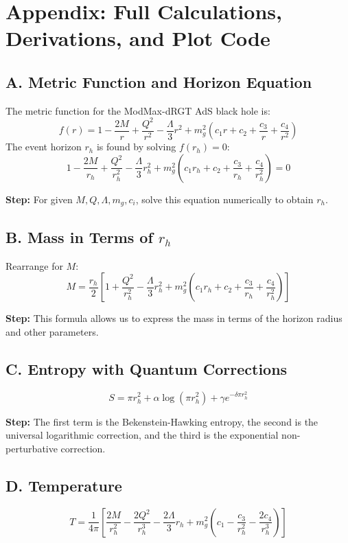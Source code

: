 \documentclass[12pt]{article}
\begin{document}
\section*{Appendix: Full Calculations, Derivations, and Plot Code}


\subsection*{A. Metric Function and Horizon Equation}
The metric function for the ModMax-dRGT AdS black hole is:
\begin{equation}
f(r) = 1 - \frac{2M}{r} + \frac{Q^2}{r^2} - \frac{\Lambda}{3} r^2 + m_g^2 (c_1 r + c_2 + \frac{c_3}{r} + \frac{c_4}{r^2})
\end{equation}
The event horizon $r_h$ is found by solving $f(r_h) = 0$:
\begin{equation}
1 - \frac{2M}{r_h} + \frac{Q^2}{r_h^2} - \frac{\Lambda}{3} r_h^2 + m_g^2 (c_1 r_h + c_2 + \frac{c_3}{r_h} + \frac{c_4}{r_h^2}) = 0
\end{equation}

\textbf{Step:} For given $M, Q, \Lambda, m_g, c_i$, solve this equation numerically to obtain $r_h$.

\subsection*{B. Mass in Terms of $r_h$}
Rearrange for $M$:
\begin{equation}
M = \frac{r_h}{2} \left[ 1 + \frac{Q^2}{r_h^2} - \frac{\Lambda}{3} r_h^2 + m_g^2 (c_1 r_h + c_2 + \frac{c_3}{r_h} + \frac{c_4}{r_h^2}) \right]
\end{equation}

\textbf{Step:} This formula allows us to express the mass in terms of the horizon radius and other parameters.

\subsection*{C. Entropy with Quantum Corrections}
\begin{equation}
S = \pi r_h^2 + \alpha \log(\pi r_h^2) + \gamma e^{-\delta \pi r_h^2}
\end{equation}

\textbf{Step:} The first term is the Bekenstein-Hawking entropy, the second is the universal logarithmic correction, and the third is the exponential non-perturbative correction.

\subsection*{D. Temperature}
\begin{equation}
T = \frac{1}{4\pi} \left[ \frac{2M}{r_h^2} - \frac{2Q^2}{r_h^3} - \frac{2\Lambda}{3} r_h + m_g^2 \left(c_1 - \frac{c_3}{r_h^2} - \frac{2c_4}{r_h^3}\right) \right]
\end{equation}
\end{document}
